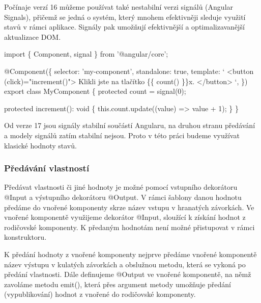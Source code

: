 Počínaje verzí 16 můžeme používat také nestabilní verzi signálů (Angular Signals), přičemž se jedná o systém, který mnohem efektivněji sleduje využití stavů v rámci aplikace. 
Signály pak umožňují efektivnější a optimalizavanější aktualizace DOM. 

\begin{prog}
import \{ Component, signal \} from '@angular/core';

@Component(\{
  selector: 'my-component',
  standalone: true,
  template: `
    <button (click)="increment()">
      Klikli jste na tlačítko \{\{ count() \}\}x.
    </button>
  `,
\})
export class MyComponent \{
  protected count = signal(0);

  protected increment(): void \{
    this.count.update((value) => value + 1);
  \}
\}
\end{prog}

Od verze 17 jsou signály stabilní součástí Angularu, na druhou stranu předávání a modely signálů zatím stabilní nejsou. 
Proto v této práci budeme využívat klasické hodnoty stavů.\cite{angulardev}

\subsubsection{Předávání vlastností}

Předávat vlastnosti či jiné hodnoty je možné pomocí vstupního dekorátoru @Input a výstupního dekorátoru @Output. 
V rámci šablony danou hodnotu předáme do vnořené komponenty skrze název vstupu v hranatých závorkách.   
Ve vnořené komponentě využijeme dekorátor @Input, sloužící k získání hodnot z rodičovské komponenty. K předaným hodnotám není možné přistupovat v rámci konstruktoru. 

K předání hodnoty z vnořené komponenty nejprve předáme vnořené komponentě název výstupu v kulatých závorkách a obslužnou metodu, která se vykoná po předání vlastnosti. 
Dále definujeme @Output ve vnořené komponentě, na němž zavoláme metodu emit(), která přes argument metody umožňuje předání (vypublikování) hodnot z vnořené do rodičovské komponenty.\cite{angulardev,learningangular}

